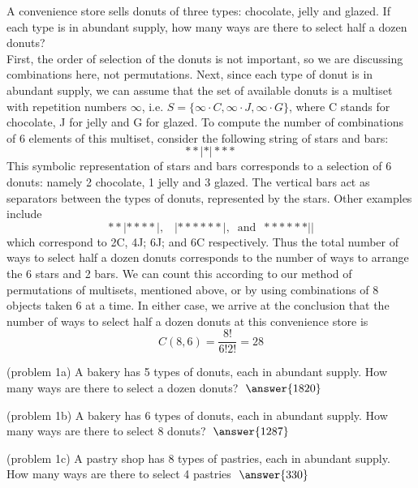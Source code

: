 \documentclass[handout]{ximera}
\begin{document}
\begin{example}[example 1]
A convenience store sells donuts of three types: chocolate, jelly and glazed.  
If each type is in abundant supply,
how many ways are there to select half a dozen donuts?\\
First, the order of selection of the donuts is not important, so we are 
discussing combinations here, not permutations.
Next, since each type of donut is in abundant supply, we can assume that the set of 
available donuts is a multiset with repetition numbers $\infty$,
i.e. $S = \{\infty \cdot C, \infty \cdot J, \infty \cdot G\}$, where C stands for 
chocolate, J for jelly and G for glazed.
To compute the number of combinations of 6 elements of this multiset, consider the 
following string of stars and bars:
\[
**|*|***
\]
This symbolic representation of stars and bars corresponds to a 
selection of 6 donuts: namely 2 chocolate, 1 jelly and 3 glazed. 
The vertical bars act as separators between the types of donuts, represented by the stars. 
Other examples include
\[
**|****|, \;\;\; |******|, \;\; \mbox{and} \;\; ******||
\]
which correspond to 2C, 4J; 6J; and 6C respectively. 
Thus the total number of ways to select half a dozen donuts 
corresponds to the number of ways to arrange the 6 stars and 2 bars. 
We can count this according to our method of permutations of multisets, mentioned 
above, or by using combinations of 8 objects taken 6 at a time. In either case, we 
arrive at the conclusion that the number of ways to select half a dozen donuts at this 
convenience store is
\[
C(8,6) = \frac{8!}{6! 2!} = 28
\]
 
\end{example}


\begin{problem}(problem 1a)
A bakery has 5 types of donuts, each in abundant supply. How many ways are there to 
select a dozen donuts?
$\; \answer{1820}$
\end{problem}

\begin{problem}(problem 1b)
A bakery has 6 types of donuts, each in abundant supply. How many ways are there to select 8 donuts?
$\; \answer{1287}$
\end{problem}

\begin{problem}(problem 1c)
A pastry shop has 8 types of pastries, each in abundant supply. 
How many ways are there to select 4 pastries $\; \answer{330}$
\end{problem}
\end{document}
